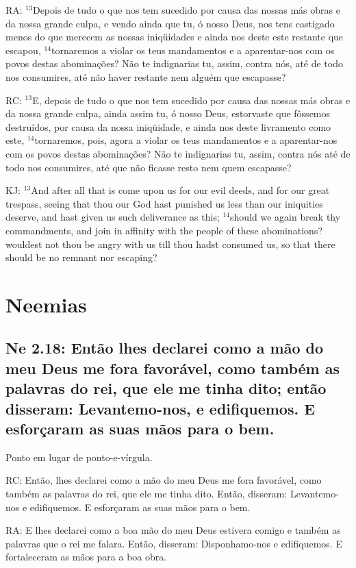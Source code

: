 RA: $^{\mathrm{13}}$Depois de tudo o que nos tem sucedido por causa
das nossas más obras e da nossa grande culpa, e vendo ainda que tu, ó
nosso Deus, nos tens castigado menos do que merecem as nossas
iniqüidades e ainda nos deste este restante que escapou,
$^{\mathrm{14}}$tornaremos a violar os teus mandamentos e a
aparentar-nos com os povos destas abominações? Não te indignarias tu,
assim, contra nós, até de todo nos consumires, até não haver restante
nem alguém que escapasse?

RC: $^{\mathrm{13}}$E, depois de tudo o que nos tem sucedido por causa
das nossas más obras e da nossa grande culpa, ainda assim tu, ó nosso
Deus, estorvaste que fôssemos destruídos, por causa da nossa
iniqüidade, e ainda nos deste livramento como este,
$^{\mathrm{14}}$tornaremos, pois, agora a violar os teus mandamentos e
a aparentar-nos com os povos destas abominações? Não te indignarias
tu, assim, contra nós até de todo nos consumires, até que não ficasse
resto nem quem escapasse?

KJ: $^{\mathrm{13}}$And after all that is come upon us for our evil
deeds, and for our great trespass, seeing that thou our God hast
punished us less than our iniquities deserve, and hast given us such
deliverance as this; $^{\mathrm{14}}$should we again break thy
commandments, and join in affinity with the people of these
abominations? wouldest not thou be angry with us till thou hadst
consumed us, so that there should be no remnant nor escaping?

\section{Neemias}
\subsection{Ne 2.18: Então lhes declarei como a mão do meu Deus me fora favorável, como também as palavras do rei, que ele me tinha dito\uline{;} então disseram: Levantemo-nos, e edifiquemos. E esforçaram as suas mãos para o bem.}
Ponto em lugar de ponto-e-vírgula.

RC: Então, lhes declarei como a mão do meu Deus me fora favorável, como também as palavras do rei, que ele me tinha dito. Então, disseram: Levantemo-nos e edifiquemos. E esforçaram as suas mãos para o bem.

RA: E lhes declarei como a boa mão do meu Deus estivera comigo e também as palavras que o rei me falara. Então, disseram: Disponhamo-nos e edifiquemos. E fortaleceram as mãos para a boa obra.

